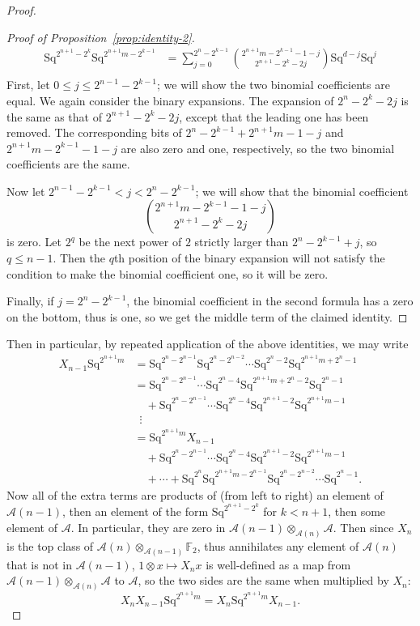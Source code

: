 \documentclass{article}
\newcommand{\A}{\mathcal{A}}
\newcommand{\F}{\mathbb{F}}
\newcommand{\Sq}{\mathrm{Sq}}
\begin{document}
\begin{proof}
\begin{proof}[Proof of Proposition~\ref{prop:identity-2}]
\begin{align*}
        \Sq^{2^{n+1}-2^k}\Sq^{2^{n+1}m-2^{k-1}} &=\sum_{j=0}^{2^n-2^{k-1}}\binom{2^{n+1}m-2^{k-1}-1-j}{2^{n+1}-2^k-2j}\Sq^{d-j}\Sq^j \\
      \end{align*}
      First, let $0\leq j\leq 2^{n-1}-2^{k-1}$; we will show the two binomial coefficients are equal.  We again consider the binary expansions.  The expansion of $2^n-2^k-2j$ is the same as that of $2^{n+1}-2^k-2j$, except that the leading one has been removed.  The corresponding bits of $2^n-2^{k-1}+2^{n+1}m-1-j$ and $2^{n+1}m-2^{k-1}-1-j$ are also zero and one, respectively, so the two binomial coefficients are the same.

      Now let $2^{n-1}-2^{k-1}<j<2^n-2^{k-1}$; we will show that the binomial coefficient
      \[\binom{2^{n+1}m-2^{k-1}-1-j}{2^{n+1}-2^k-2j}\]
      is zero.  Let $2^q$ be the next power of $2$ strictly larger than $2^n-2^{k-1}+j$, so $q\leq n-1$.  Then the $q$th position of the binary expansion will not satisfy the condition to make the binomial coefficient one, so it will be zero.

      Finally, if $j=2^n-2^{k-1}$, the binomial coefficient in the second formula has a zero on the bottom, thus is one, so we get the middle term of the claimed identity.
    \end{proof}

    Then in particular, by repeated application of the above identities, we may write
    \begin{align*}
      X_{n-1}\Sq^{2^{n+1}m} &= \Sq^{2^n-2^{n-1}}\Sq^{2^n-2^{n-2}}\cdots\Sq^{2^n-2}\Sq^{2^{n+1}m+2^n-1} \\
        &= \Sq^{2^n-2^{n-1}}\cdots\Sq^{2^n-4}\Sq^{2^{n+1}m+2^n-2}\Sq^{2^n-1} \\
        &\quad + \Sq^{2^n-2^{n-1}}\cdots\Sq^{2^n-4}\Sq^{2^{n+1}-2}\Sq^{2^{n+1}m-1}\\
        &\ \;\vdots \\
        &=\Sq^{2^{n+1}m}X_{n-1}\\
        &\quad + \Sq^{2^n-2^{n-1}}\cdots\Sq^{2^n-4}\Sq^{2^{n+1}-2}\Sq^{2^{n+1}m-1}\\
        &\quad + \cdots + \Sq^{2^n}\Sq^{2^{n+1}m-2^{n-1}}\Sq^{2^n-2^{n-2}}\cdots\Sq^{2^n-1}.
    \end{align*}
    Now all of the extra terms are products of (from left to right) an element of $\A(n-1)$, then an element of the form $\Sq^{2^{n+1}-2^k}$ for $k<n+1$, then some element of $\A$.  In particular, they are zero in $\A(n-1)\otimes_{\A(n)}\A$.  Then since $X_n$ is the top class of $\A(n)\otimes_{\A(n-1)}\F_2$, thus annihilates any element of $\A(n)$ that is not in $\A(n-1)$, $1\otimes x\mapsto X_nx$ is well-defined as a map from $\A(n-1)\otimes_{\A(n)}\A$ to $\A$, so the two sides are the same when multiplied by $X_n$:
    \[X_nX_{n-1}\Sq^{2^{n+1}m} = X_n\Sq^{2^{n+1}m}X_{n-1}.\]

  \end{proof}
\end{document}
